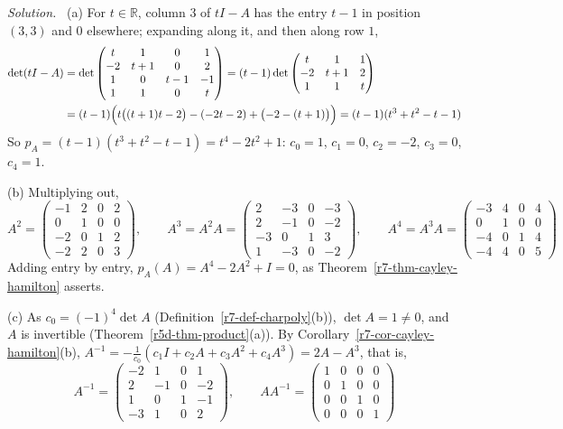 \documentclass[12pt]{article}
\newcommand{\R}{\mathbb R}
\theoremstyle{definition}
\newenvironment{solution}{\par\noindent\textit{Solution.}\ }{\par\smallskip}
\begin{document}
\begin{solution}
(a) For \(t\in\R\), column \(3\) of \(tI-A\) has the entry \(t-1\) in position \((3,3)\) and \(0\) elsewhere; expanding
along it, and then along row \(1\),
\[
\begin{aligned}
\det(tI-A)&=\det\begin{pmatrix}t&1&0&1\\-2&t+1&0&2\\1&0&t-1&-1\\1&1&0&t\end{pmatrix}
=(t-1)\det\begin{pmatrix}t&1&1\\-2&t+1&2\\1&1&t\end{pmatrix}\\
&=(t-1)\Bigl(t\bigl((t+1)t-2\bigr)-(-2t-2)+\bigl(-2-(t+1)\bigr)\Bigr)=(t-1)(t^3+t^2-t-1)
\end{aligned}
\]
So \(p_A=(t-1)(t^3+t^2-t-1)=t^4-2t^2+1\): \(c_0=1\), \(c_1=0\), \(c_2=-2\), \(c_3=0\), \(c_4=1\).

(b) Multiplying out,
\[
A^2=\begin{pmatrix}-1&2&0&2\\0&1&0&0\\-2&0&1&2\\-2&2&0&3\end{pmatrix},\qquad
A^3=A^2A=\begin{pmatrix}2&-3&0&-3\\2&-1&0&-2\\-3&0&1&3\\1&-3&0&-2\end{pmatrix},\qquad
A^4=A^3A=\begin{pmatrix}-3&4&0&4\\0&1&0&0\\-4&0&1&4\\-4&4&0&5\end{pmatrix}
\]
Adding entry by entry, \(p_A(A)=A^4-2A^2+I=0\), as Theorem~\ref{r7-thm-cayley-hamilton} asserts.

(c) As \(c_0=(-1)^4\det A\) (Definition~\ref{r7-def-charpoly}(b)), \(\det A=1\ne0\), and \(A\) is invertible
(Theorem~\ref{r5d-thm-product}(a)). By Corollary~\ref{r7-cor-cayley-hamilton}(b),
\(A^{-1}=-\frac1{c_0}(c_1I+c_2A+c_3A^2+c_4A^3)=2A-A^3\), that is,
\[
A^{-1}=\begin{pmatrix}-2&1&0&1\\2&-1&0&-2\\1&0&1&-1\\-3&1&0&2\end{pmatrix},\qquad
AA^{-1}=\begin{pmatrix}1&0&0&0\\0&1&0&0\\0&0&1&0\\0&0&0&1\end{pmatrix}
\]


\end{solution}
\end{document}
